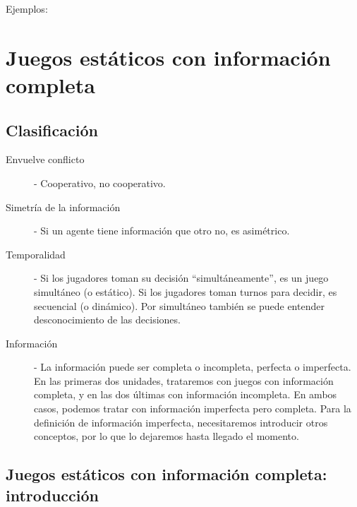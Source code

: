 \documentclass[12pt]{scrartcl}
\theoremstyle{definition}
\begin{document}
\begin{exbox}{Ejemplos:}

%

\end{exbox}

\section[Teoría de juegos]{Juegos estáticos con información completa}

\subsection{Clasificación}

\begin{description}
    \item[Envuelve conflicto] - Cooperativo, no cooperativo.
    \item[Simetría de la información] - Si un agente tiene información que otro no, es asimétrico. 
    \item[Temporalidad] - Si los jugadores toman su decisión ``simultáneamente'', es un juego simultáneo (o estático). Si los jugadores toman turnos para decidir, es secuencial (o dinámico). Por simultáneo también se puede entender desconocimiento de las decisiones.
    \item[Información] - La información puede ser completa o incompleta, perfecta o imperfecta. En las primeras dos unidades, trataremos con juegos con información completa, y en las dos últimas con información incompleta. En ambos casos, podemos tratar con información imperfecta pero completa. Para la definición de información imperfecta, necesitaremos introducir otros conceptos, por lo que lo dejaremos hasta llegado el momento.

\end{description}

\subsection{Juegos estáticos con información completa: introducción}
\end{document}
